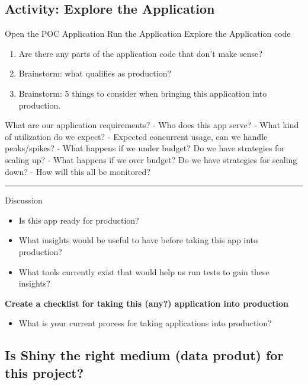 \documentclass[]{book}
\providecommand{\tightlist}{%
  \setlength{\itemsep}{0pt}\setlength{\parskip}{0pt}}
\begin{document}
\hypertarget{activity-explore-the-application}{%
\subsection{Activity: Explore the
Application}\label{activity-explore-the-application}}

Open the POC Application Run the Application Explore the Application
code

\begin{enumerate}
\def\labelenumi{\arabic{enumi}.}
\tightlist
\item
  Are there any parts of the application code that don't make sense?
\item
  Brainstorm: what qualifies as production?
\item
  Brainstorm: 5 things to consider when bringing this application into
  production.
\end{enumerate}

What are our application requirements? - Who does this app serve? - What
kind of utilization do we expect? - Expected concurrent usage, can we
handle peaks/spikes? - What happens if we under budget? Do we have
strategies for scaling up? - What happens if we over budget? Do we have
strategies for scaling down? - How will this all be monitored?

\begin{center}\rule{0.5\linewidth}{\linethickness}\end{center}

Discussion

\begin{itemize}
\tightlist
\item
  Is this app ready for production?
\item
  What insights would be useful to have before taking this app into
  production?
\item
  What tools currently exist that would help us run tests to gain these
  insights?
\end{itemize}

\textbf{Create a checklist for taking this (any?) application into
production}

\begin{itemize}
\tightlist
\item
  What is your current process for taking applications into production?
\end{itemize}

\hypertarget{is-shiny-the-right-medium-data-produt-for-this-project}{%
\subsection{Is Shiny the right medium (data produt) for this
project?}\label{is-shiny-the-right-medium-data-produt-for-this-project}}
\end{document}
